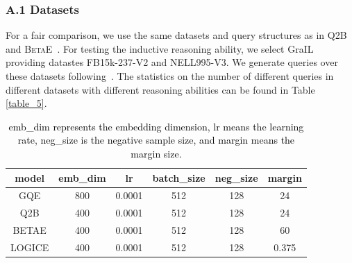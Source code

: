\subsubsection*{A.1  Datasets}
\label{datasets}
For a fair comparison, we use the same datasets and query structures as in Q2B~\cite{query2box:ren2020} and \textsc{BetaE}~\cite{ren2020beta}. 
For testing the inductive reasoning ability, we select GraIL~\cite{teru2020inductive} providing datastes FB15k-237-V2 and NELL995-V3. We  generate  queries over these datasets following~\cite{ren2020beta}. 
%
The statistics on the number of different queries in different datasets with different reasoning abilities can be found in Table \ref{table_5}.
\vspace{-0.02cm}
\vspace{-0.35cm}
\begin{table}[htp]
\renewcommand\arraystretch{0.60}
\setlength{\abovecaptionskip}{-0.05cm}
\setlength{\tabcolsep}{0.40em}
\setlength{\belowcaptionskip}{-0.4cm}
\centering
\begin{tabular*}{\linewidth}{@{}cccccc@{}}
\toprule
model & emb\_dim & lr & batch\_size & neg\_size & margin\\
\toprule
GQE & 800 & 0.0001 & 512 & 128 & 24 \\
Q2B & 400 & 0.0001 & 512 & 128 & 24 \\
\textsc{BETAE} & 400 & 0.0001 & 512 & 128 & 60 \\
\textsc{LOGICE} & 400 & 0.0001 & 512 & 128 & 0.375 \\
\midrule
\end{tabular*}
\caption{ \textcolor{black}{emb\_dim represents the embedding dimension, lr means the learning rate, neg\_size is the negative sample size, and margin means the margin size.
}}
\label{table_6}
\end{table}

